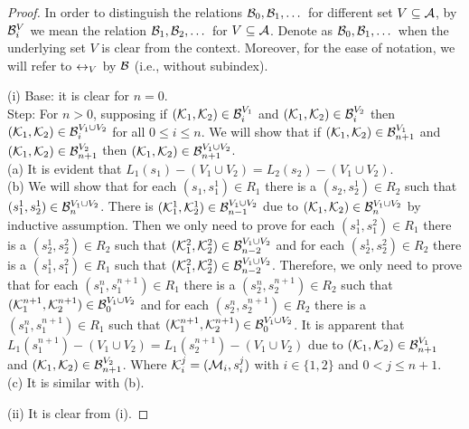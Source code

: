 \documentclass{article}
\begin{document}
\begin{proof}
In order to distinguish the relations ${\cal B}_0, {\cal B}_1, \dots$ for different set $V \subseteq {\cal A}$, by ${\cal B}_i^V$ we mean the relation ${\cal B}_1, {\cal B}_2, \dots$ for $V \subseteq {\cal A}$.
Denote as ${\cal B}_0, {\cal B}_1, \dots$ when the underlying set $V$ is clear from the context. Moreover, for the ease of notation, we will refer to $\leftrightarrow_V$ by ${\cal B}$ (i.e., without subindex).

(i) Base: it is clear for $n = 0$.\\
Step: For $n > 0$, supposing if $({\cal K}_1, {\cal K}_2) \in {\cal B}_i^{V_1}$ and $({\cal K}_1, {\cal K}_2) \in {\cal B}_i^{V_2}$ then $({\cal K}_1, {\cal K}_2) \in {\cal B}_i^{V_1 \cup V_2}$ for all $0 \leq i \leq n$. We will show that if $({\cal K}_1, {\cal K}_2) \in {\cal B}_{n+1}^{V_1}$ and $({\cal K}_1, {\cal K}_2) \in {\cal B}_{n+1}^{V_2}$ then $({\cal K}_1, {\cal K}_2) \in {\cal B}_{n+1}^{V_1 \cup V_2}$.\\
(a) It is evident that $L_1(s_1) - (V_1 \cup V_2) = L_2(s_2) - (V_1\cup V_2)$.\\
(b) We will show that for each $(s_1, s_1^1) \in R_1$ there is a $(s_2, s_2^1) \in R_2$ such that $(s_1^1, s_2^1) \in {\cal B}_n^{V_1 \cup V_2}$. There is $({\cal K}_1^1, {\cal K}_2^1) \in {\cal B}_{n-1}^{V_1 \cup V_2}$
due to $({\cal K}_1, {\cal K}_2) \in {\cal B}_n^{V_1 \cup V_2}$ by inductive assumption. Then we only need to prove for each $(s_1^1, s_1^2) \in R_1$ there is a $(s_2^1, s_2^2) \in R_2$ such that $({\cal K}_1^2, {\cal K}_2^2) \in {\cal B}_{n-2}^{V_1 \cup V_2}$ and for each $(s_2^1, s_2^2) \in R_2$ there is a $(s_1^1, s_1^2) \in R_1$ such that $({\cal K}_1^2, {\cal K}_2^2) \in {\cal B}_{n-2}^{V_1 \cup V_2}$. Therefore, we only need to prove that for each $(s_1^n, s_1^{n+1}) \in R_1$ there is a $(s_2^n, s_2^{n+1}) \in R_2$ such that $({\cal K}_1^{n+1}, {\cal K}_2^{n+1}) \in {\cal B}_0^{V_1 \cup V_2}$ and for each $(s_2^n, s_2^{n+1}) \in R_2$ there is a $(s_1^n, s_1^{n+1}) \in R_1$ such that $({\cal K}_1^{n+1}, {\cal K}_2^{n+1}) \in {\cal B}_0^{V_1 \cup V_2}$. It is apparent that $L_1(s_1^{n+1}) - (V_1 \cup V_2) = L_1(s_2^{n+1}) - (V_1 \cup V_2)$ due to $({\cal K}_1, {\cal K}_2) \in {\cal B}_{n+1}^{V_1}$ and $({\cal K}_1, {\cal K}_2) \in {\cal B}_{n+1}^{V_2}$.
Where ${\cal K}_i^j = ({\cal M}_i, s_i^j)$ with $i \in \{1, 2\}$ and $0 < j \leq n+1$.\\
(c) It is similar with (b).

(ii) It is clear from (i).


\end{proof}
\end{document}
